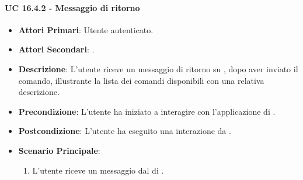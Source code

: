		\paragraph{UC 16.4.2 - Messaggio di ritorno}
		\begin{itemize}
			\item \textbf{Attori Primari}: Utente autenticato.
			\item \textbf{Attori Secondari}: .
			\item \textbf{Descrizione}: L'utente riceve un messaggio di ritorno su , dopo aver inviato il comando, illustrante la lista dei comandi disponibili con una relativa descrizione.
			\item \textbf{Precondizione}: L'utente ha iniziato a interagire con l'applicazione di .
			\item \textbf{Postcondizione}: L'utente ha eseguito una interazione da .
			\item \textbf{Scenario Principale}:
			\begin{enumerate}
				\item L'utente riceve un messaggio dal  di .
			\end{enumerate}
		\end{itemize}	